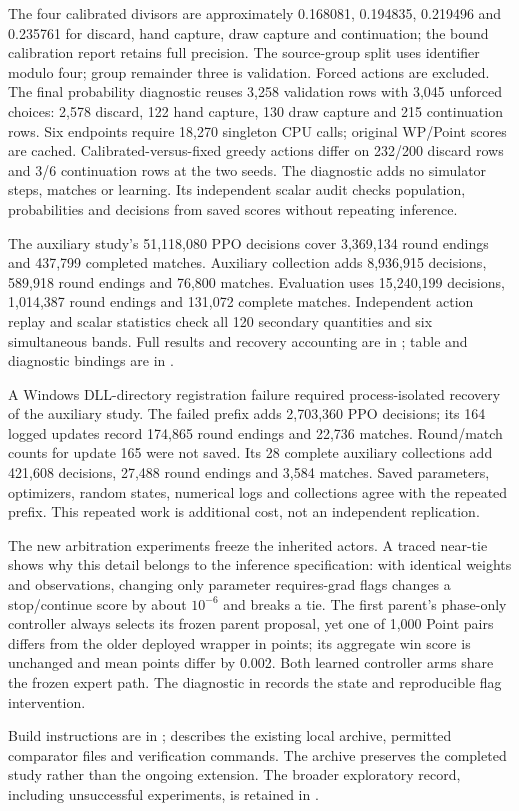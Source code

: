 The four calibrated divisors are approximately 0.168081, 0.194835, 0.219496
and 0.235761 for discard, hand capture, draw capture and continuation;
the bound calibration report retains full precision. The source-group split uses identifier modulo four;
group remainder three is validation. Forced actions are excluded. The final
probability diagnostic reuses 3,258 validation rows with 3,045 unforced choices:
2,578 discard, 122 hand capture, 130 draw capture and 215 continuation rows.
Six endpoints require 18,270 singleton CPU calls; original WP/Point scores are
cached. Calibrated-versus-fixed greedy actions differ on 232/200 discard rows
and 3/6 continuation rows at the two seeds. The diagnostic adds no simulator
steps, matches or learning. Its independent scalar audit checks population,
probabilities and decisions from saved scores without repeating inference.

The auxiliary study's 51,118,080 PPO decisions cover 3,369,134 round endings
and 437,799 completed matches. Auxiliary collection adds 8,936,915 decisions,
589,918 round endings and 76,800 matches. Evaluation uses 15,240,199 decisions,
1,014,387 round endings and 131,072 complete matches. Independent action replay
and scalar statistics check all 120 secondary quantities and six simultaneous
bands. Full results and recovery accounting are in
; table and diagnostic bindings are in
.

A Windows DLL-directory registration failure required process-isolated recovery
of the auxiliary study. The failed prefix adds 2,703,360 PPO decisions; its 164
logged updates record 174,865 round endings and 22,736 matches. Round/match
counts for update 165 were not saved. Its 28 complete auxiliary collections
add 421,608 decisions, 27,488 round endings and 3,584 matches. Saved parameters,
optimizers, random states, numerical logs and collections agree with the
repeated prefix. This repeated work is additional cost, not an independent
replication.

The new arbitration experiments freeze the inherited actors. A traced
near-tie shows why this detail belongs to the inference specification: with
identical weights and observations, changing only parameter requires-grad
flags changes a stop/continue score by about $10^{-6}$ and breaks a tie.
The first parent's phase-only controller always selects its frozen parent
proposal, yet one of 1,000 Point pairs differs from the older deployed wrapper
in points; its aggregate win score is unchanged and mean points differ by 0.002.
Both learned controller arms share the frozen expert path. The diagnostic in
 records the state and reproducible flag intervention.

Build instructions are in ;
 describes the existing local archive, permitted
comparator files and verification commands. The archive preserves the completed
study rather than the ongoing extension. The broader exploratory record,
including unsuccessful experiments, is retained in .


